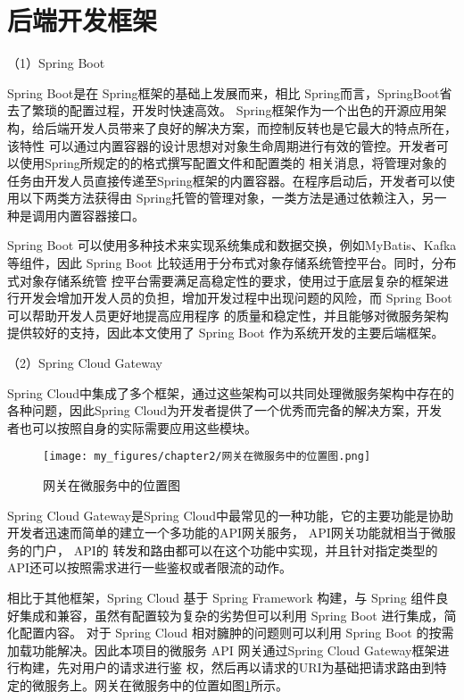 \section{后端开发框架}

（1）Spring Boot


Spring Boot是在 Spring框架的基础上发展而来\cite{konggyong2015keji}，相比 Spring而言，SpringBoot省去了繁琐的配置过程，开发时快速高效。
Spring框架作为一个出色的开源应用架构，给后端开发人员带来了良好的解决方案，而控制反转也是它最大的特点所在，该特性
可以通过内置容器的设计思想对对象生命周期进行有效的管控。开发者可以使用Spring所规定的的格式撰写配置文件和配置类的
相关消息，将管理对象的任务由开发人员直接传递至Spring框架的内置容器\cite{kongqingyong201ji}。在程序启动后，开发者可以使用以下两类方法获得由
Spring托管的管理对象，一类方法是通过依赖注入，另一种是调用内置容器接口。

Spring Boot 可以使用多种技术来实现系统集成和数据交换，例如MyBatis、Kafka 等组件，因此 Spring Boot 比较适用于分布式对象存储系统管控平台。同时，分布式对象存储系统管
控平台需要满足高稳定性的要求，使用过于底层复杂的框架进行开发会增加开发人员的负担，增加开发过程中出现问题的风险，而 Spring Boot 可以帮助开发人员更好地提高应用程序
的质量和稳定性，并且能够对微服务架构提供较好的支持，因此本文使用了 Spring Boot 作为系统开发的主要后端框架。


（2）Spring Cloud Gateway

Spring Cloud中集成了多个框架，通过这些架构可以共同处理微服务架构中存在的各种问题\cite{kon2201ji}，因此Spring Cloud为开发者提供了一个优秀而完备的解决方案，开发
者也可以按照自身的实际需要应用这些模块。

\begin{figure}[h]
    \centering
    \texttt{[image: my\_figures/chapter2/网关在微服务中的位置图.png]}
    \caption{网关在微服务中的位置图}
    \label{fig:/网关在微服务中的位置图}
\end{figure}

Spring Cloud Gateway是Spring Cloud中最常见的一种功能，它的主要功能是协助开发者迅速而简单的建立一个多功能的API网关服务， API网关功能就相当于微服务的门户， API的
转发和路由都可以在这个功能中实现，并且针对指定类型的API还可以按照需求进行一些鉴权或者限流的动作。

相比于其他框架，Spring Cloud 基于 Spring Framework 构建，与 Spring 组件良好集成和兼容，虽然有配置较为复杂的劣势但可以利用 Spring Boot 进行集成，简化配置内容。
对于 Spring Cloud 相对臃肿的问题则可以利用 Spring Boot 的按需加载功能解决。因此本项目的微服务 API 网关通过Spring Cloud Gateway框架进行构建，先对用户的请求进行鉴
权，然后再以请求的URI为基础把请求路由到特定的微服务上。网关在微服务中的位置如图\ref{fig:/网关在微服务中的位置图}所示。

